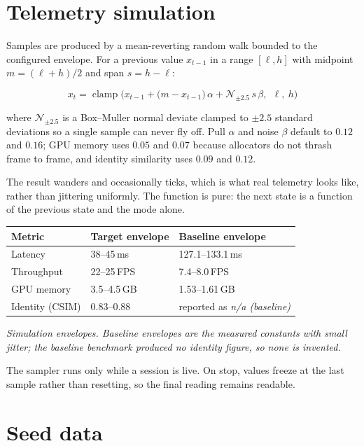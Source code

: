 \documentclass[11pt,a4paper]{report}
\begin{document}
\section{Telemetry simulation}

Samples are produced by a mean-reverting random walk bounded to the configured
envelope. For a previous value $x_{t-1}$ in a range $[\ell, h]$ with midpoint
$m = (\ell + h)/2$ and span $s = h - \ell$:

\[
x_t = \operatorname{clamp}\Big(x_{t-1} + \big(m - x_{t-1}\big)\,\alpha
      + \mathcal{N}_{\pm 2.5}\,s\,\beta,\ \ \ell,\ h\Big)
\]

where $\mathcal{N}_{\pm 2.5}$ is a Box--Muller normal deviate clamped to
$\pm 2.5$ standard deviations so a single sample can never fly off. Pull
$\alpha$ and noise $\beta$ default to $0.12$ and $0.16$; GPU memory uses
$0.05$ and $0.07$ because allocators do not thrash frame to frame, and
identity similarity uses $0.09$ and $0.12$.

The result wanders and occasionally ticks, which is what real telemetry looks
like, rather than jittering uniformly. The function is pure: the next state is
a function of the previous state and the mode alone.

\begin{longtable}{L{3.4cm} L{4.4cm} L{4.4cm}}
\toprule
\textbf{Metric} & \textbf{Target envelope} & \textbf{Baseline envelope} \\
\midrule
\endhead
Latency & 38--45\,ms & 127.1--133.1\,ms \\
Throughput & 22--25\,FPS & 7.4--8.0\,FPS \\
GPU memory & 3.5--4.5\,GB & 1.53--1.61\,GB \\
Identity (CSIM) & 0.83--0.88 & reported as \emph{n/a (baseline)} \\
\bottomrule
\end{longtable}
\noindent\textit{\small Simulation envelopes. Baseline envelopes are the measured constants
with small jitter; the baseline benchmark produced no identity figure, so none
is invented.}\par\medskip

The sampler runs only while a session is live. On stop, values freeze at the
last sample rather than resetting, so the final reading remains readable.

\section{Seed data}
\end{document}
